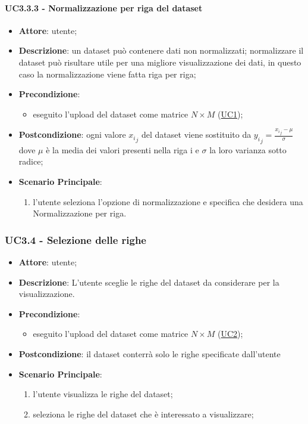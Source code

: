     \paragraph{UC3.3.3 - Normalizzazione per riga del dataset}
    \label{uc5.2.3}
    \begin{itemize}
    \item \textbf{Attore}: utente;
    \item \textbf{Descrizione}: un dataset può contenere dati non normalizzati; normalizzare il dataset può risultare utile per una migliore visualizzazione dei dati, in questo caso la normalizzazione viene fatta riga per riga;
    \item \textbf{Precondizione}: 
    \begin{itemize}
        \item eseguito l'upload del dataset come matrice $N\times M$ (\hyperref[uc1]{UC1});
    \end{itemize}  
    \item \textbf{Postcondizione}: ogni valore ${x_i}_j$ del dataset viene sostituito da $ {y_i}_j = \frac{{x_i}_j - \mu}{\sigma}$ dove $\mu$ è la media dei valori presenti nella riga i e $\sigma$ la loro varianza sotto radice;
    \item \textbf{Scenario Principale}: 
    \begin{enumerate}
        \item l'utente seleziona l'opzione di normalizzazione e specifica che desidera una Normalizzazione per riga.
    \end{enumerate}  
    \end{itemize}
    
    \subsubsection{UC3.4 - Selezione delle righe}
\label{uc3.4}


    \begin{itemize}
    \item \textbf{Attore}: utente;
    \item \textbf{Descrizione}: L'utente sceglie le righe del dataset da considerare per la visualizzazione.
    \item \textbf{Precondizione}:
    \begin{itemize}
        \item eseguito l'upload del dataset come matrice $N\times M$ (\hyperref[uc2]{UC2});
    \end{itemize}
    \item \textbf{Postcondizione}: il dataset conterrà solo le righe specificate dall'utente
    \item \textbf{Scenario Principale}: 
    \begin{enumerate}
        \item l'utente visualizza le righe del dataset;
        \item seleziona le righe del dataset che è interessato a visualizzare;
    \end{enumerate}  
    \end{itemize}
    